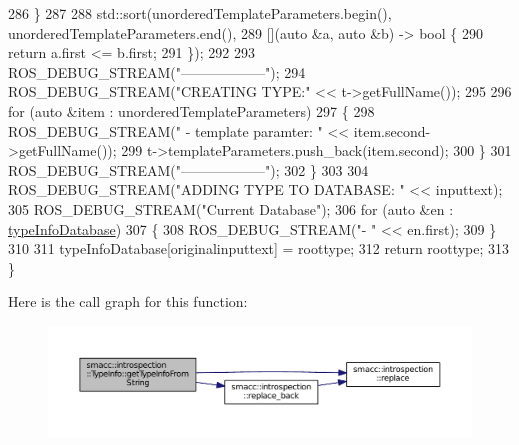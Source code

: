 \begin{DoxyCode}
286         \}
287 
288         std::sort(unorderedTemplateParameters.begin(), unorderedTemplateParameters.end(),
289                   [](\textcolor{keyword}{auto} &a, \textcolor{keyword}{auto} &b) -> \textcolor{keywordtype}{bool} \{
290                       \textcolor{keywordflow}{return} a.first <= b.first;
291                   \});
292 
293         ROS\_DEBUG\_STREAM(\textcolor{stringliteral}{"------------------"});
294         ROS\_DEBUG\_STREAM(\textcolor{stringliteral}{"CREATING TYPE:"} << t->getFullName());
295 
296         \textcolor{keywordflow}{for} (\textcolor{keyword}{auto} &item : unorderedTemplateParameters)
297         \{
298             ROS\_DEBUG\_STREAM(\textcolor{stringliteral}{" - template paramter: "} << item.second->getFullName());
299             t->templateParameters.push\_back(item.second);
300         \}
301         ROS\_DEBUG\_STREAM(\textcolor{stringliteral}{"------------------"});
302     \}
303 
304     ROS\_DEBUG\_STREAM(\textcolor{stringliteral}{"ADDING TYPE TO DATABASE: "} << inputtext);
305     ROS\_DEBUG\_STREAM(\textcolor{stringliteral}{"Current Database"});
306     \textcolor{keywordflow}{for} (\textcolor{keyword}{auto} &en : \hyperlink{classsmacc_1_1introspection_1_1TypeInfo_ab780c03206b824aaf338135d16b0eff4}{typeInfoDatabase})
307     \{
308         ROS\_DEBUG\_STREAM(\textcolor{stringliteral}{"- "} << en.first);
309     \}
310 
311     typeInfoDatabase[originalinputtext] = roottype;
312     \textcolor{keywordflow}{return} roottype;
313 \}
\end{DoxyCode}


Here is the call graph for this function\+:
\nopagebreak
\begin{figure}[H]
\begin{center}
\leavevmode
\includegraphics[width=350pt]{classsmacc_1_1introspection_1_1TypeInfo_a47d65b6c61499d7ae8ab9f6325c84837_cgraph}
\end{center}
\end{figure}




